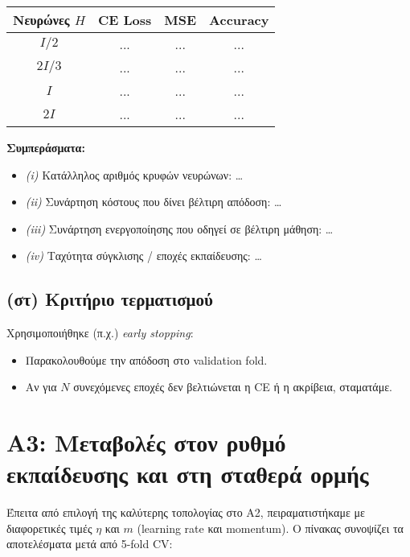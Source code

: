 \documentclass[a4paper,11pt]{article}
\begin{document}
\begin{center}
\begin{tabular}{|c|c|c|c|}
\hline
\textbf{Νευρώνες $H$} & \textbf{CE Loss} & \textbf{MSE} & \textbf{Accuracy} \\
\hline
$I/2$   & ... & ... & ... \\
\hline
$2I/3$  & ... & ... & ... \\
\hline
$I$     & ... & ... & ... \\
\hline
$2I$    & ... & ... & ... \\
\hline
\end{tabular}
\end{center}

\noindent
\textbf{Συμπεράσματα:}
\begin{itemize}
    \item \emph{(i)} Κατάλληλος αριθμός κρυφών νευρώνων: \dots
    \item \emph{(ii)} Συνάρτηση κόστους που δίνει βέλτιρη απόδοση: \dots
    \item \emph{(iii)} Συνάρτηση ενεργοποίησης που οδηγεί σε βέλτιρη μάθηση: \dots
    \item \emph{(iv)} Ταχύτητα σύγκλισης / εποχές εκπαίδευσης: \dots
\end{itemize}

\subsection{(στ) Κριτήριο τερματισμού}
Χρησιμοποιήθηκε (π.χ.) \emph{early stopping}:
\begin{itemize}
    \item Παρακολουθούμε την απόδοση στο validation fold.
    \item Αν για $N$ συνεχόμενες εποχές δεν βελτιώνεται η CE ή η ακρίβεια, σταματάμε.
\end{itemize}

\section{A3: Μεταβολές στον ρυθμό εκπαίδευσης και στη σταθερά ορμής}
Έπειτα από επιλογή της καλύτερης τοπολογίας στο Α2, πειραματιστήκαμε με διαφορετικές
τιμές $\eta$ και $m$ (learning rate και momentum). Ο πίνακας συνοψίζει τα αποτελέσματα
μετά από 5-fold CV:
\end{document}
